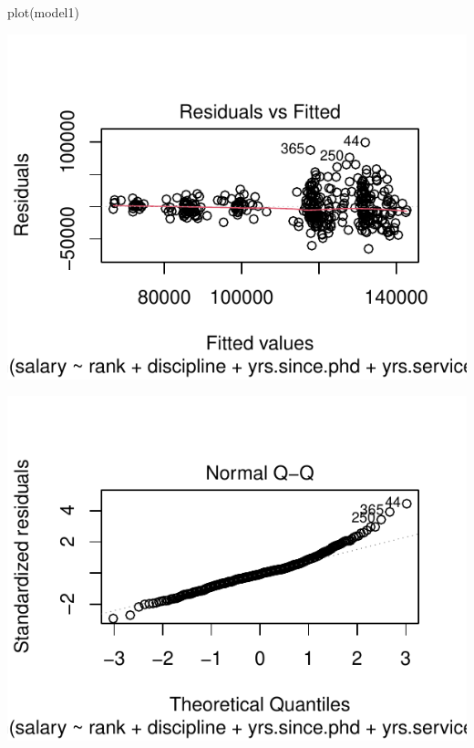 \documentclass[
]{article}
\newenvironment{Shaded}{\begin{snugshade}}{\end{snugshade}}
\newcommand{\FunctionTok}[1]{\textcolor[rgb]{0.00,0.00,0.00}{#1}}
\newcommand{\NormalTok}[1]{#1}
\begin{document}
\begin{Shaded}
\begin{Highlighting}[]
\FunctionTok{plot}\NormalTok{(model1)}
\end{Highlighting}
\end{Shaded}

\begin{center}\includegraphics{compulsory_files/figure-latex/load_data-1} \end{center}

\begin{center}\includegraphics{compulsory_files/figure-latex/load_data-2} \end{center}
\end{document}

